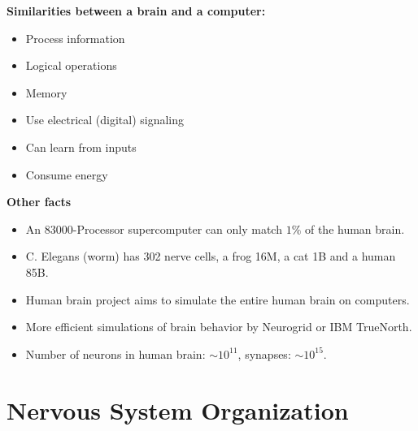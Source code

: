 \documentclass[a4paper, 12pt]{article}
\begin{document}
\textbf{Similarities between a brain and a computer:}
\begin{itemize}[noitemsep,nolistsep]
	\item Process information
	\item Logical operations
	\item Memory
	\item Use electrical (digital) signaling
	\item Can learn from inputs
	\item Consume energy
\end{itemize}
\textbf{Other facts}
\begin{itemize}[noitemsep,nolistsep]
	\item An 83000-Processor supercomputer can only match $1\%$ of the human brain.
	\item C. Elegans (worm) has 302 nerve cells, a frog 16M, a cat 1B and a human 85B.
	\item Human brain project aims to simulate the entire human brain on computers.
	\item More efficient simulations of brain behavior by Neurogrid or IBM TrueNorth.
	\item Number of neurons in human brain: $\sim10^{11}$, synapses: $\sim10^{15}$.
	
\end{itemize}

\section{Nervous System Organization}
\end{document}
